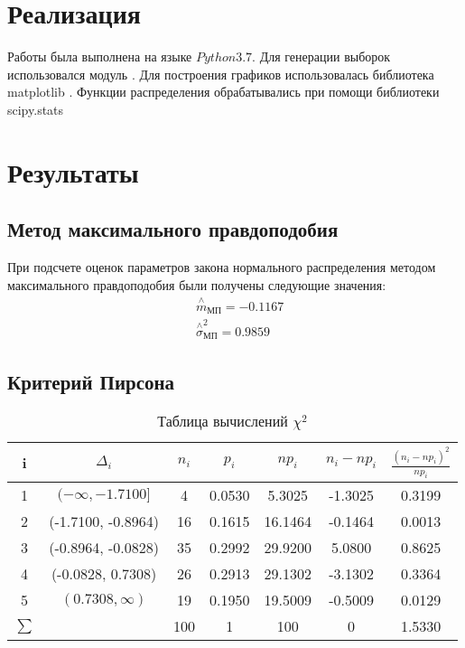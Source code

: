\documentclass[12pt]{article}
\begin{document}
\section{Реализация}
Работы была выполнена на языке $Python 3.7.$
Для генерации выборок использовался модуль \cite{numpy}.
Для построения графиков использовалась библиотека matplotlib \cite{plotlib}.
Функции распределения обрабатывались при помощи библиотеки scipy.stats \cite{skp}


\section{Результаты}
\subsection{Метод максимального правдоподобия}

При подсчете оценок параметров закона нормального распределения методом максимального правдоподобия были получены следующие значения:
\begin{equation}
\begin{split}
    &\overset{\wedge}{m}_{\text{МП}} = -0.1167\\
   &  \overset{\wedge}{\sigma}^2_{\text{МП}} = 0.9859
\end{split}
\end{equation}
\subsection{Критерий Пирсона}
\begin{table}[H]
\caption{Таблица вычислений $\chi^2$}
\label{tab:my_label1}
\begin{center}
\vspace{5mm}
\begin{tabular}{|c|c|c|c|c|c|c|}
\hline
 i & $\Delta_i$ & $n_i$ & $p_i$ & $np_i$ & $n_i-np_i$ & $\frac{(n_i-np_i)^2}{np_i}$\\
\hline
1&	 $(-\infty, -1.7100]$ &	4  &0.0530& 5.3025& -1.3025& 0.3199\\
\hline
2& (-1.7100, -0.8964)& 16& 0.1615& 16.1464& -0.1464& 0.0013\\
\hline
3& (-0.8964, -0.0828)& 35& 0.2992& 29.9200& 5.0800& 0.8625\\
\hline
4& (-0.0828, 0.7308)& 26& 0.2913& 29.1302& -3.1302& 0.3364\\
\hline
5& $(0.7308, \infty)$& 19& 0.1950& 19.5009& -0.5009& 0.0129\\
\hline
$\sum$&&		100&	1&	100&0&1.5330	\\

\hline
\end{tabular}
\end{center}
\end{table}
\end{document}
